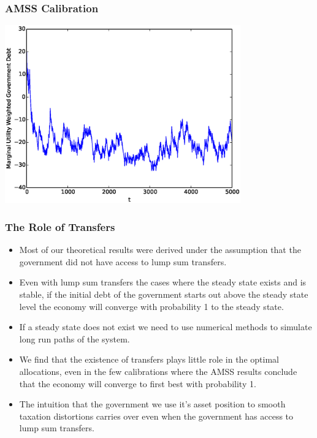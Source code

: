 \documentclass{beamer}
\begin{document}
\begin{frame}
	\frametitle{AMSS Calibration}
	\begin{center}
	\includegraphics[width=4in]{Images/AMSS.eps}
	\end{center}
\end{frame}


 \begin{frame}
  \frametitle{The Role of Transfers}
	\begin{itemize}
		\item  Most of our theoretical results were derived under the assumption that the government did not have access to lump sum transfers.
		\item  Even with lump sum transfers the cases where the steady state exists and is stable, if the initial debt of the government starts out above the steady state level the economy will converge with probability 1 to the steady state.
		\item  If a steady state does not exist we need to use numerical methods to simulate long run paths of the system.
		\item  We find that the existence of transfers plays little role in the optimal allocations, even in the few calibrations where the AMSS results conclude that the economy will converge to first best with probability 1.
		\item  The intuition that the government we use it's asset position to smooth taxation distortions carries over even when the government has access to lump sum transfers.
	\end{itemize}
 \end{frame}
\end{document}
